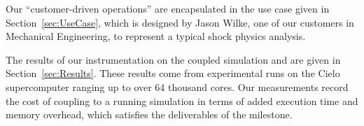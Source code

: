 Our ``customer-driven operations'' are encapsulated in the use case given
in Section~\ref{sec:UseCase}, which is designed by Jason Wilke, one of our
customers in Mechanical Engineering, to represent a typical shock physics
analysis.

The results of our instrumentation on the coupled simulation and \vda are
given in Section~\ref{sec:Results}.  These results come from experimental
runs on the Cielo supercomputer ranging up to over 64
thousand cores.  Our measurements record the cost of coupling \vda to a
running simulation in terms of added execution time and memory overhead,
which satisfies the deliverables of the milestone.
